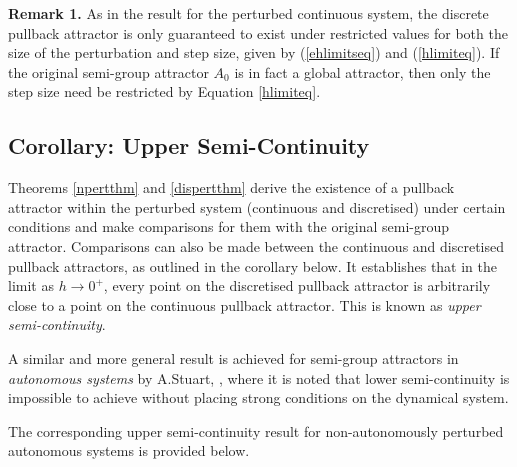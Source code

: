   {\bf Remark 1.} As in the result for the perturbed continuous system, the
  discrete pullback attractor is only guaranteed to exist under restricted
  values for both the size of the perturbation and step size, given by
  (\ref{ehlimitseq}) and (\ref{hlimiteq}). If the original semi-group
  attractor $A_0$ is in fact a global attractor, then only the step size
  need be restricted by Equation \ref{hlimiteq}.

\subsection{Corollary: Upper Semi-Continuity}

Theorems \ref{npertthm} and \ref{dispertthm} derive the existence
of a pullback attractor within the perturbed system (continuous
and discretised) under certain conditions and make comparisons for
them with the original semi-group attractor. Comparisons can also
be made between the continuous and discretised pullback
attractors, as outlined in the corollary below. It establishes
that in the limit as $h \rightarrow 0^+$, every point on the
discretised pullback attractor is arbitrarily close to a point on
the continuous pullback attractor. This is known as { \em upper
semi-continuity}.

A similar and more general result is achieved
for semi-group attractors in \textit{autonomous systems} by A.Stuart,
\cite{St94}, where it is noted that lower semi-continuity is
impossible to achieve without placing strong conditions on the
dynamical system.

The corresponding upper semi-continuity result for non-autonomously perturbed
autonomous systems is provided below.

